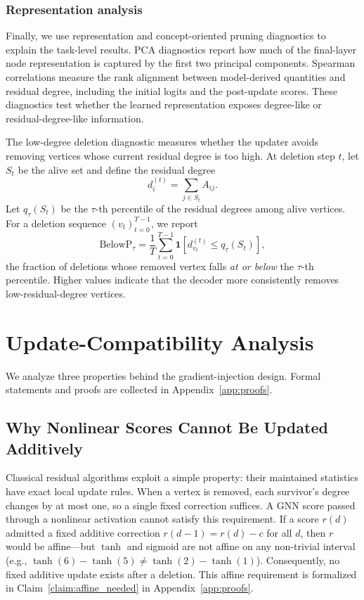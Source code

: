 \documentclass[mathematics,article,submit,pdftex,moreauthors]{Definitions/mdpi}
\begin{document}
\subsubsection{Representation analysis}

Finally, we use representation and concept-oriented pruning diagnostics to explain
the task-level results. PCA diagnostics report how much of the final-layer node
representation is captured by the first two principal components. Spearman
correlations measure the rank alignment between model-derived quantities and residual
degree, including the initial logits and the post-update scores. These diagnostics
test whether the learned representation exposes degree-like or residual-degree-like
information.

The low-degree deletion diagnostic measures whether the updater avoids removing
vertices whose current residual degree is too high. At deletion step $t$, let
$S_t$ be the alive set and define the residual degree
\[
  d_i^{(t)} = \sum_{j\in S_t} A_{ij}.
\]
Let $q_\tau(S_t)$ be the $\tau$-th percentile of the residual degrees among alive
vertices. For a deletion sequence $(v_t)_{t=0}^{T-1}$, we report
\[
  \mathrm{BelowP}_\tau
  =
  \frac{1}{T}
  \sum_{t=0}^{T-1}
  \mathbf{1}
  \left[
    d_{v_t}^{(t)} \le q_\tau(S_t)
  \right],
\]
the fraction of deletions whose removed vertex falls \emph{at or below} the
$\tau$-th percentile. Higher values indicate that the decoder more consistently
removes low-residual-degree vertices.

\section{Update-Compatibility Analysis}
\label{sec:theory}

We analyze three properties behind the gradient-injection design. Formal statements
and proofs are collected in Appendix~\ref{app:proofs}.

\subsection{Why Nonlinear Scores Cannot Be Updated Additively}

Classical residual algorithms exploit a simple property: their maintained statistics
have exact local update rules. When a vertex is removed, each survivor's degree
changes by at most one, so a single fixed correction suffices. A GNN score passed
through a nonlinear activation cannot satisfy this requirement. If a score $r(d)$
admitted a fixed additive correction $r(d-1) = r(d) - c$ for all $d$, then $r$
would be affine---but $\tanh$ and sigmoid are not affine on any non-trivial interval
(e.g., $\tanh(6)-\tanh(5) \neq \tanh(2)-\tanh(1)$). Consequently, no fixed
additive update exists after a deletion. This affine requirement is formalized in
Claim~\ref{claim:affine_needed} in Appendix~\ref{app:proofs}.
\end{document}
